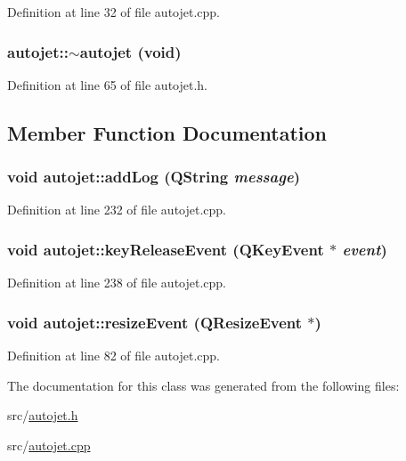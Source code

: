 Definition at line 32 of file autojet.cpp.\hypertarget{classautojet_7212daec39a5deac5eb4fb4588a35455}{
\subsubsection[{$\sim$autojet}]{\setlength{\rightskip}{0pt plus 5cm}autojet::$\sim$autojet (void)}}
\label{classautojet_7212daec39a5deac5eb4fb4588a35455}




Definition at line 65 of file autojet.h.

\subsection{Member Function Documentation}
\hypertarget{classautojet_640ed2fd0823498ed55c79127564d860}{
\subsubsection[{addLog}]{\setlength{\rightskip}{0pt plus 5cm}void autojet::addLog (QString {\em message})}}
\label{classautojet_640ed2fd0823498ed55c79127564d860}




Definition at line 232 of file autojet.cpp.\hypertarget{classautojet_04fa5ae957fcba538b0ff39e46a5642b}{
\subsubsection[{keyReleaseEvent}]{\setlength{\rightskip}{0pt plus 5cm}void autojet::keyReleaseEvent (QKeyEvent $\ast$ {\em event})}}
\label{classautojet_04fa5ae957fcba538b0ff39e46a5642b}




Definition at line 238 of file autojet.cpp.\hypertarget{classautojet_7114cf8399871627b93ebcf6c6ef9f95}{
\subsubsection[{resizeEvent}]{\setlength{\rightskip}{0pt plus 5cm}void autojet::resizeEvent (QResizeEvent $\ast$)}}
\label{classautojet_7114cf8399871627b93ebcf6c6ef9f95}




Definition at line 82 of file autojet.cpp.

The documentation for this class was generated from the following files:\begin{CompactItemize}
\item 
src/\hyperlink{autojet_8h}{autojet.h}\item 
src/\hyperlink{autojet_8cpp}{autojet.cpp}\end{CompactItemize}
